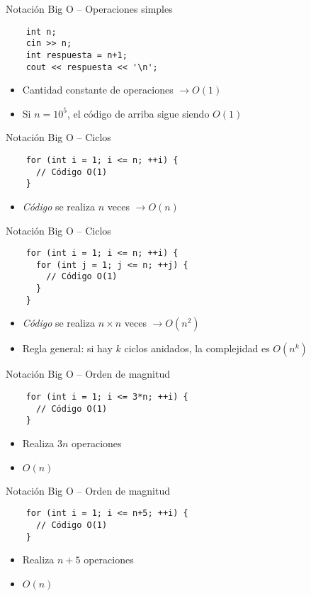 \documentclass[10pt]{beamer}
\newcommand{\bi}{\begin{itemize}}
\newcommand{\ei}{\end{itemize}}
\begin{document}
\begin{frame}[fragile]{Notación Big O -- Operaciones simples}
  \begin{verbatim}
    int n;
    cin >> n;
    int respuesta = n+1;
    cout << respuesta << '\n';
  \end{verbatim}
  \bi
    \item Cantidad constante de operaciones $\rightarrow O(1)$
    \item Si $n = 10^5$, el código de arriba sigue siendo $O(1)$
  \ei
\end{frame}

\begin{frame}[fragile]{Notación Big O -- Ciclos}
  \begin{verbatim}
    for (int i = 1; i <= n; ++i) {
      // Código O(1)
    }
  \end{verbatim}
  \bi
    \item \textit{Código} se realiza $n$ veces $\rightarrow O(n)$
  \ei
\end{frame}

\begin{frame}[fragile]{Notación Big O -- Ciclos}
  \begin{verbatim}
    for (int i = 1; i <= n; ++i) {
      for (int j = 1; j <= n; ++j) {
        // Código O(1)
      }
    }
  \end{verbatim}
  \bi
    \item \textit{Código} se realiza $n \times n$ veces $\rightarrow O(n^2)$
    \item <2-> Regla general: si hay $k$ ciclos anidados, la complejidad es $O(n^k)$
  \ei
\end{frame}

\begin{frame}[fragile]{Notación Big O -- Orden de magnitud}
  \begin{verbatim}
    for (int i = 1; i <= 3*n; ++i) {
      // Código O(1)
    }
  \end{verbatim}
  \bi
    \item Realiza $3n$ operaciones
    \item <2-> $O(n)$
  \ei
\end{frame}

\begin{frame}[fragile]{Notación Big O -- Orden de magnitud}
  \begin{verbatim}
    for (int i = 1; i <= n+5; ++i) {
      // Código O(1)
    }
  \end{verbatim}
  \bi
    \item Realiza $n+5$ operaciones
    \item <2-> $O(n)$
  \ei
\end{frame}
\end{document}
